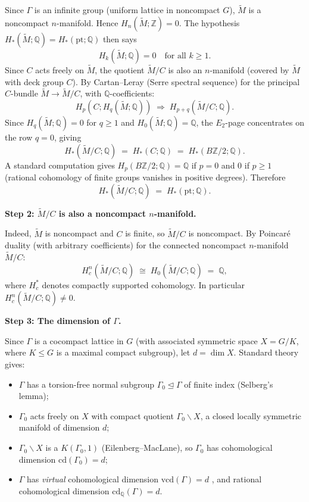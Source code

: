 Since $\Gamma$ is an infinite group (uniform lattice in noncompact $G$), $\widetilde M$ is a noncompact $n$-manifold.  Hence $H_n(\widetilde M;\mathbb Z)=0$.  The hypothesis $H_*(\widetilde M;\mathbb Q)=H_*(\mathrm{pt};\mathbb Q)$ then says
\[
H_k(\widetilde M;\mathbb Q)=0\quad\text{for all }k\ge 1.
\]
Since $C$ acts freely on $\widetilde M$, the quotient $\widetilde M/C$ is also an $n$-manifold (covered by $\widetilde M$ with deck group $C$).  By Cartan--Leray (Serre spectral sequence) for the principal $C$-bundle $\widetilde M\to\widetilde M/C$, with $\mathbb Q$-coefficients:
\[
H_p(C;H_q(\widetilde M;\mathbb Q))\;\Rightarrow\;H_{p+q}(\widetilde M/C;\mathbb Q).
\]
Since $H_q(\widetilde M;\mathbb Q)=0$ for $q\ge 1$ and $H_0(\widetilde M;\mathbb Q)=\mathbb Q$, the $E_2$-page concentrates on the row $q=0$, giving
\[
H_*(\widetilde M/C;\mathbb Q)\;=\;H_*(C;\mathbb Q)\;=\;H_*(B\mathbb Z/2;\mathbb Q).
\]
A standard computation gives $H_p(B\mathbb Z/2;\mathbb Q)=\mathbb Q$ if $p=0$ and $0$ if $p\ge 1$ (rational cohomology of finite groups vanishes in positive degrees).  Therefore
\begin{equation}\label{eq:Q-acyclic-quotient}
H_*(\widetilde M/C;\mathbb Q)\;=\;H_*(\mathrm{pt};\mathbb Q).
\end{equation}

\medskip
\noindent\textbf{Step 2: $\widetilde M/C$ is also a noncompact $n$-manifold.}

Indeed, $\widetilde M$ is noncompact and $C$ is finite, so $\widetilde M/C$ is noncompact.  By Poincaré duality (with arbitrary coefficients) for the connected noncompact $n$-manifold $\widetilde M/C$:
\[
H^{n}_c(\widetilde M/C;\mathbb Q)\;\cong\;H_0(\widetilde M/C;\mathbb Q)\;=\;\mathbb Q,
\]
where $H^*_c$ denotes compactly supported cohomology.  In particular $H^n_c(\widetilde M/C;\mathbb Q)\ne 0$.

\medskip
\noindent\textbf{Step 3: The dimension of $\Gamma$.}

Since $\Gamma$ is a cocompact lattice in $G$ (with associated symmetric space $X=G/K$, where $K\le G$ is a maximal compact subgroup), let $d=\dim X$.  Standard theory gives:
\begin{itemize}\setlength\itemsep{2pt}
\item $\Gamma$ has a torsion-free normal subgroup $\Gamma_0\trianglelefteq\Gamma$ of finite index (Selberg's lemma);
\item $\Gamma_0$ acts freely on $X$ with compact quotient $\Gamma_0\backslash X$, a closed locally symmetric manifold of dimension $d$;
\item $\Gamma_0\backslash X$ is a $K(\Gamma_0,1)$ (Eilenberg--MacLane), so $\Gamma_0$ has cohomological dimension $\mathrm{cd}(\Gamma_0)=d$;
\item $\Gamma$ has \emph{virtual} cohomological dimension $\mathrm{vcd}(\Gamma)=d$ \cite{Brown}, and rational cohomological dimension $\mathrm{cd}_{\mathbb Q}(\Gamma)=d$.
\end{itemize}

